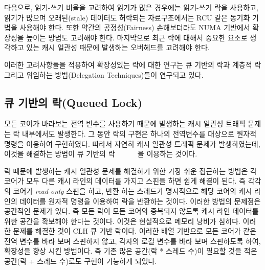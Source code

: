 다음으로, 읽기-쓰기 비율을 고려하여 읽기가 많은 경우에는 읽기-쓰기 락을 사용하고,
읽기가 많으며 오래된(stale) 데이터도 허락되는 자료구조에서는 RCU 같은 동기화 기법을 사용해야 한다.  
또한 약간의 공정성(Fairness) 손해보더라도 NUMA 기반에서 확장성을 높이는 방법도 고려해야 한다.
마지막으로 최근 락에 대해서 중요한 요소로 생각하고 있는 캐시 일관성 때문에 발생하는 
오버헤드를 고려해야 한다. 


%


이러한 고려사항들을 적용하여 확장성있는 락에 대한 연구는 큐 기반의
락과 계층적 락 그리고 위임하는 방법(Delegation Techniques)들이 연구되고 있다. 

\subsection{큐 기반의 락(Queued Lock)}
모든 코어가 바라보는 전역 변수를 사용하기 때문에 발생하는 캐시 일관성 트래픽 문제는 
락 내부에서도 발생한다. 
그 동안 락의 구현은 하나의 전역변수를 대상으로 원자적 명령을 이용하여 구현하였다. 
따라서 자연히 캐시 일관성 트래픽 문제가 발생하였는데, 이것을 해결하는 방법이 큐 기반의 락
~\cite{MellorCrummey1991MCS}~\cite{Magnusson1994QLC}~\cite{Wang2016BeMyGuest}~\cite{Scott2013SS}
~\cite{Bueso2014MCS}을 이용하는 것이다. 

락 때문에 발생하는 캐시 일관성 문제를 해결하기 위한 가장 쉬운 접근하는 방법은 각 
코어가 모두 다른 캐시 라인의 데이터를 가지고 스핀을 하면 쉽게 해결이 된다.
즉 각각의 코어가 \textit{read-only} 스핀을 하고, 반환 하는 스레드가 명시적으로 해당 코어의 캐시 라인의 데이터를 
원자적 명령을 이용하여 락을 반환하는 것이다. 
이러한 방법의 문제점은 공간적인 문제가 있다. 
즉 모든 락이 모든 코어의 중복되지 않도록 캐시 라인 데이터를 위한 공간을 확보해야 한다는 것이다.
이것은 현실적으로 메모리 낭비가 심히다.
이러한 문제를 해결한 것이 CLH 큐 기반 락이다. 
이러한 배열 기반으로 모든 코어가 같은 전역 변수를 바라 보며 스핀하지 않고, 
각자의 로컬 변수를 바라 보며 스핀하도록 하여, 확장성을 향상 시킨 방법이다. 
즉 기존 많은 공간(락 * 스레드 수)이 필요할 것을 적은 공간(락 + 스레드 수)로도 구현이 가능하게 되었다.

